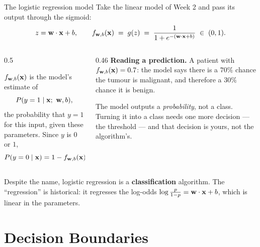 \documentclass[aspectratio=169,10pt]{beamer}
\begin{document}
\begin{frame}{The logistic regression model}
  \small
  Take the linear model of Week 2 and pass its output through the sigmoid:
  \[
    z = \mathbf{w}\cdot\mathbf{x} + b, \qquad
    f_{\mathbf{w},b}(\mathbf{x}) \;=\; g(z) \;=\; \frac{1}{1+e^{-(\mathbf{w}\cdot\mathbf{x}+b)}} \;\in\;(0,1).
  \]
  \begin{columns}[T,onlytextwidth]
    \begin{column}{0.5\textwidth}
      \begin{defnbox}
        \footnotesize
        $f_{\mathbf{w},b}(\mathbf{x})$ is the model's estimate of
        \[ P(y=1 \mid \vx;\ \vw,b), \]
        the probability that $y=1$ for this input, given these parameters.
        Since $y$ is $0$ or $1$,
        \[ P(y=0\mid\mathbf{x}) = 1 - f_{\mathbf{w},b}(\mathbf{x}). \]
      \end{defnbox}
    \end{column}
    \begin{column}{0.46\textwidth}
      \footnotesize
      \textbf{Reading a prediction.} A patient with $f_{\mathbf{w},b}(\mathbf{x})=0.7$: the model says
      there is a $70\%$ chance the tumour is malignant, and therefore a $30\%$ chance it is
      benign.
      \vspace{1mm}
      \begin{keyidea}
        \footnotesize
        The model outputs a \emph{probability}, not a class. Turning it into a class needs one
        more decision --- the threshold --- and that decision is yours, not the algorithm's.
      \end{keyidea}
    \end{column}
  \end{columns}
  \vspace{1mm}
  \footnotesize
  Despite the name, logistic regression is a \textbf{classification} algorithm. The
  ``regression'' is historical: it regresses the log-odds $\log\frac{p}{1-p} = \mathbf{w}\cdot\mathbf{x}+b$,
  which is linear in the parameters.
\end{frame}

\section{Decision Boundaries}
\end{document}
